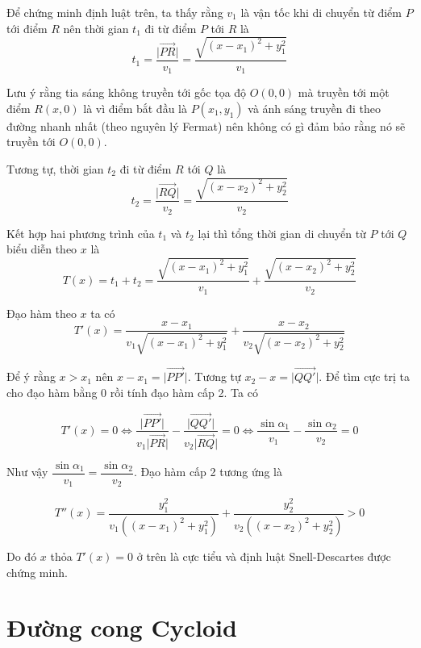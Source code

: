 \documentclass{article}
\begin{document}
Để chứng minh định luật trên, ta thấy rằng $v_1$ là vận tốc khi di chuyển từ điểm $P$ tới điểm $R$ nên thời gian $t_1$ đi từ điểm $P$ tới $R$ là
\begin{equation}
	t_1 = \frac{\lvert \overrightarrow{PR} \rvert}{v_1} = \frac{\sqrt{(x - x_1)^2 + y_1^2}}{v_1}
\end{equation}

Lưu ý rằng tia sáng không truyền tới gốc tọa độ $O(0,0)$ mà truyền tới một điểm $R(x,0)$ là vì điểm bắt đầu là $P(x_1, y_1)$ và ánh sáng truyền đi theo đường nhanh nhất (theo nguyên lý Fermat) nên không có gì đảm bảo rằng nó sẽ truyền tới $O(0, 0)$.

Tương tự, thời gian $t_2$ đi từ điểm $R$ tới $Q$ là
\begin{equation}
	t_2 = \frac{\lvert \overrightarrow{RQ} \rvert}{v_2} = \frac{\sqrt{(x - x_2)^2 + y_2^2}}{v_2}
\end{equation}

Kết hợp hai phương trình của $t_1$ và $t_2$ lại thì tổng thời gian di chuyển từ $P$ tới $Q$ biểu diễn theo $x$ là
\begin{equation}
	T(x) = t_1 + t_2 = \frac{\sqrt{(x - x_1)^2 + y_1^2}}{v_1} + \frac{\sqrt{(x - x_2)^2 + y_2^2}}{v_2}
\end{equation}

Đạo hàm theo $x$ ta có
\begin{equation}
	T'(x) = \frac{x - x_1}{v_1 \sqrt{(x - x_1)^2 + y_1^2}} + \frac{x - x_2}{v_2 \sqrt{(x - x_2)^2 + y_2^2}}
\end{equation}

Để ý rằng $x > x_1$ nên $x - x_1 = \lvert \overrightarrow{PP'} \rvert$. Tương tự $x_2 - x = \lvert \overrightarrow{QQ'} \rvert$. Để tìm cực trị ta cho đạo hàm bằng 0 rồi tính đạo hàm cấp 2. Ta có

\[T'(x) = 0 \Leftrightarrow \frac{\lvert \overrightarrow{PP'} \rvert}{v_1 \lvert \overrightarrow{PR} \rvert} - \frac{\lvert \overrightarrow{QQ'} \rvert}{v_2 \lvert \overrightarrow{RQ} \rvert} = 0 \Leftrightarrow \frac{\sin \alpha_1}{v_1} - \frac{\sin \alpha_2}{v_2} = 0\]

Như vậy $\dfrac{\sin \alpha_1}{v_1} = \dfrac{\sin \alpha_2}{v_2}$. Đạo hàm cấp 2 tương ứng là

\[ T''(x) = \frac{y_1^2}{v_1 ((x - x_1)^2 + y_1^2)} + \frac{y_2^2}{v_2 ((x - x_2)^2 + y_2^2)} > 0 \]

Do đó $x$ thỏa $T'(x) = 0$ ở trên là cực tiểu và định luật Snell-Descartes được chứng minh.

\section{Đường cong Cycloid}
\end{document}
